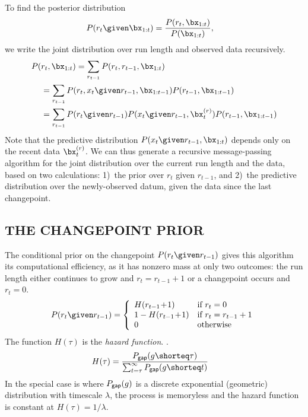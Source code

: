 \documentclass[]{article}
\begin{document}
    To find the posterior distribution
    \begin{align}\label{eqn:run-length-posterior}
      P(r_{t} \given \bx_{1:t}) &=
      \frac{P(r_{t},\bx_{1:t})}{P(\bx_{1:t})},
    \end{align}
    we write the joint distribution over run length and observed data
    recursively.
    \begin{align}
      P(&r_{t},\bx_{1:t}) = \sum_{r_{t-1}} P(r_{t},r_{t-1},\bx_{1:t})\notag\\
      \label{eqn:recursive-joint-1}
      &= \sum_{r_{t-1}} P(r_{t},x_{t} \given r_{t-1}, \bx_{1:t-1})
                        P(r_{t-1}, \bx_{1:t-1})\\
      &= \sum_{r_{t-1}} P(r_{t} \given r_{t-1})
                        P(x_{t} \given r_{t-1}, \bx_{t}^{(r)})
			P(r_{t-1},\bx_{1:t-1})\notag
    \end{align}
    Note that the predictive distribution $P(x_{t}\given r_{t-1},
    \bx_{1:t})$ depends only on the recent data $\bx_{t}^{(r)}$.  We can
    thus generate a recursive message-passing algorithm for the joint
    distribution over the current run length and the data, based on two
    calculations: 1)~the prior over $r_{t}$ given $r_{t-1}$, and 2)~the
    predictive distribution over the newly-observed datum, given the data
    since the last changepoint.

    \subsection{THE CHANGEPOINT PRIOR}
      The conditional prior on the changepoint $P(r_{t} \given r_{t-1})$
      gives this algorithm its computational efficiency, as it has nonzero
      mass at only two outcomes: the run length either continues to grow
      and $r_{t} = r_{t-1}+1$ or a changepoint occurs and $r_{t}=0$.
      \begin{align}\label{eqn:cond-prior}
	P(r_{t}\given r_{t-1}) = \left\{\begin{array}{ll}
	  H(r_{t-1}\!+\!1) & \mbox{if $r_{t}=0$}\\
	  1 - H(r_{t-1}\!+\!1) & \mbox{if $r_{t}=r_{t-1}+1$}\\
	  0 & \mbox{otherwise}
	\end{array}\right.
      \end{align}
      The function $H(\tau)$ is the \textit{hazard function}.
      \cite{evans-etal-2000a}.
      \begin{align}\label{eqn:hazard-function}
	H(\tau) &= \frac{P_{\sf{gap}}(g\shorteq\tau)}
	                {\sum_{t=\tau}^{\infty}P_{\sf{gap}}(g\shorteq t)}
      \end{align}
      In the special case is where $P_{\sf{gap}}(g)$ is a discrete
      exponential (geometric) distribution with timescale $\lambda$, the
      process is memoryless and the hazard function is constant at
      $H(\tau)=1/\lambda$.
\end{document}
